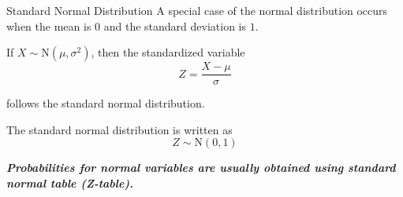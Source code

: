 \documentclass[12pt, aspectratio=169]{beamer}
\begin{document}








	\begin{frame}{Standard Normal Distribution}
		A special case of the normal distribution occurs when the mean is \(0\) and the standard deviation is \(1\).

		\vspace{0.5em}

		If \(X \sim \mathrm{N}(\mu, \sigma^2)\), then the standardized variable
		\[
			Z = \frac{X-\mu}{\sigma}
		\]

		follows the standard normal distribution.

		\vspace{0.5em}

		The standard normal distribution is written as
		\[
			Z \sim \mathrm{N}(0,1)
		\]

		\textbf{\emph{Probabilities for normal variables are usually obtained using standard normal table (Z-table).}}
	\end{frame}
\end{document}

